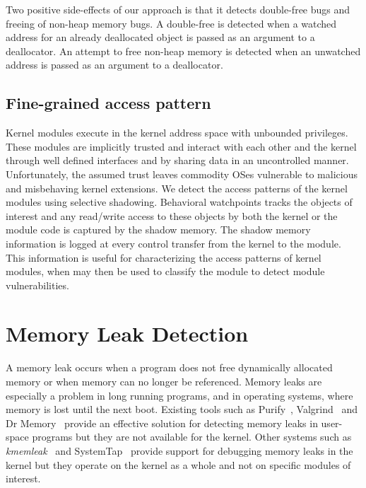 

Two positive side-effects of our approach is that it detects double-free bugs and freeing of non-heap memory bugs. A double-free is detected when a watched address for an already deallocated object is passed as an argument to a deallocator. An attempt to free non-heap memory is detected when an unwatched address is passed as an argument to a deallocator.

\subsection{Fine-grained access pattern}
Kernel modules execute in the kernel address space with unbounded privileges. These modules are implicitly trusted and interact with each other and the kernel through well defined interfaces and by sharing data in an uncontrolled manner. Unfortunately, the assumed trust leaves commodity OSes vulnerable to malicious and misbehaving kernel extensions\cite{BGI,LXFI, Xu:2004:DEC:1038254.1038305}. We detect the access patterns of the kernel modules using selective shadowing. Behavioral watchpoints tracks the objects of interest and any read/write access to these objects by both the kernel or the module code is captured by the shadow memory. 
The shadow memory information is logged at every control transfer from the kernel to the module. This information is useful for characterizing the access patterns of kernel modules, when may then be used to classify the module to detect module vulnerabilities.

\section{Memory Leak Detection\label{sec:memory_leaks}}
A memory leak occurs when a program does not free dynamically allocated memory or when memory can no longer be referenced. Memory leaks are especially a problem in long running programs, and in operating systems, where memory is lost until the next boot. Existing tools such as Purify~\cite{Rs_purify:fast}, Valgrind~\cite{Seward:2005:UVD:1247360.1247362} and Dr Memory~\cite{Bruening:2011:PMC:2190025.2190067} provide an effective solution for detecting memory leaks in user-space programs but they are not available for the kernel. Other systems such as \emph{kmemleak}~\cite{kmemleak} and SystemTap~\cite{EIgler05architectureof} provide support for debugging memory leaks in the kernel but they operate on the kernel as a whole and not on specific modules of interest.

